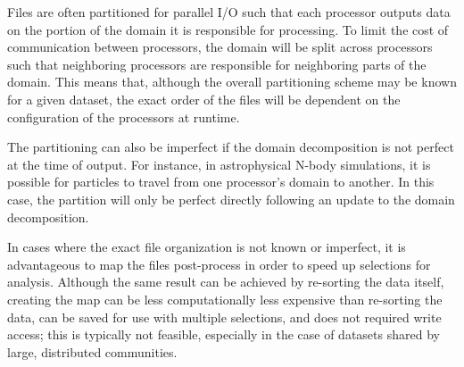 \documentclass[apjl]{emulateapj}
\begin{document}
Files are often partitioned for parallel I/O such that each processor outputs data on the portion of the domain it is responsible for processing. To limit the cost of communication between processors, the domain will be split across processors such that neighboring processors are responsible for neighboring parts of the domain. This means that, although the overall partitioning scheme may be known for a given dataset, the exact order of the files will be dependent on the configuration of the processors at runtime. 

The partitioning can also be imperfect if the domain decomposition is not perfect at the time of output. For instance, in astrophysical N-body simulations, it is possible for particles to travel from one processor's domain to another. In this case, the partition will only be perfect directly following an update to the domain decomposition. 

In cases where the exact file organization is not known or imperfect, it is advantageous to map the files post-process in order to speed up selections for analysis. Although the same result can be achieved by re-sorting the data itself, creating the map can be less computationally less expensive than re-sorting the data, can be saved for use with multiple selections, and does not required write access; this is typically not feasible, especially in the case of datasets shared by large, distributed communities.

\end{document}
